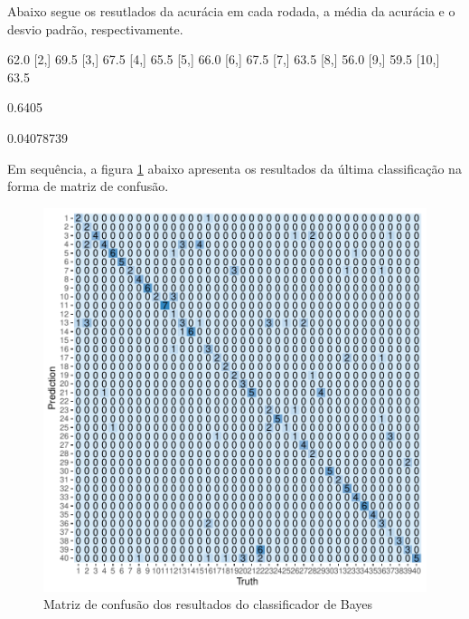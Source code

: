 \documentclass[12pt]{article}
\begin{document}
  \par Abaixo segue os resutlados da acurácia em cada rodada, a média da acurácia e o desvio padrão, respectivamente.
  
\begin{Schunk}
\begin{Soutput}
      [,1]
 [1,] 62.0
 [2,] 69.5
 [3,] 67.5
 [4,] 65.5
 [5,] 66.0
 [6,] 67.5
 [7,] 63.5
 [8,] 56.0
 [9,] 59.5
[10,] 63.5
\end{Soutput}
\end{Schunk}

\begin{Schunk}
\begin{Soutput}
[1] 0.6405
\end{Soutput}
\begin{Soutput}
[1] 0.04078739
\end{Soutput}
\end{Schunk}


\par Em sequência, a figura \ref{1} abaixo apresenta os resultados da última classificação na forma de matriz de confusão.

\begin{figure}[ht]
\centering
\includegraphics{PCA-008}
\caption{Matriz de confusão dos resultados do classificador de Bayes}
\label{1}
\end{figure}
\end{document}
